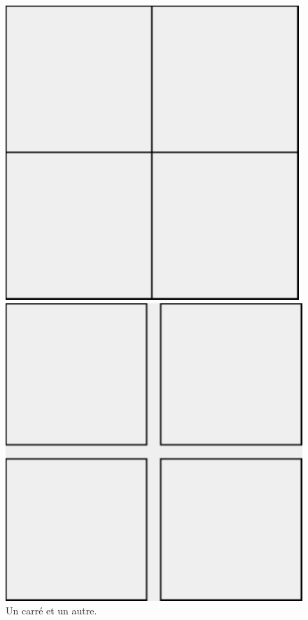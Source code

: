 \begin{figure}[!htbp]
\begin{minipage}[c]{.4\linewidth}
\centerline{\includegraphics[width=\linewidth]{c7groscarre}}
\end{minipage}
\hfill
\begin{minipage}[c]{.4\linewidth}
\centerline{\includegraphics[width=\linewidth]{c7groscarre2}}
\end{minipage}
\caption{Un carr\'e et un autre.}
\label{c7groscarre}
\end{figure}
 

